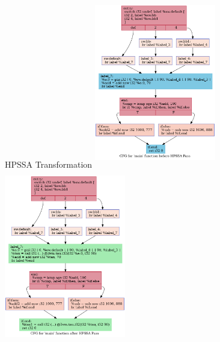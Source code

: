 \documentclass[aspectratio=169]{beamer}
\begin{document}
\begin{frame}{HPSSA Transformation}
	\includegraphics[width=5.3cm,height=7.5cm]{baseline.dot.png}
	\includegraphics[width=5.3cm,height=7.5cm]{afterHPSSA.dot.png}
\end{frame}
\end{document}
